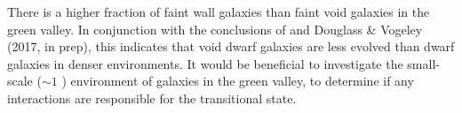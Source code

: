 There is a higher fraction of faint wall galaxies than faint void galaxies in 
the green valley.  In conjunction with the conclusions of \cite{Douglass17b} and 
Douglass \& Vogeley (2017, in prep), this indicates that void dwarf galaxies are 
less evolved than dwarf galaxies in denser environments.  It would be beneficial 
to investigate the small-scale ($\sim 1$ \hMpc) environment of galaxies in the 
green valley, to determine if any interactions are responsible for the 
transitional state.